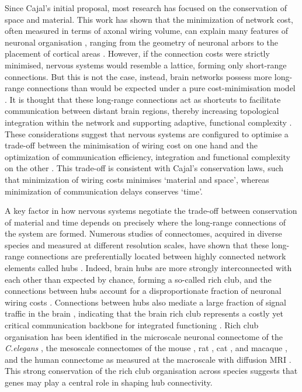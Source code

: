 Since Cajal's initial proposal, most research has focused on the conservation of space and material. This work has shown that the minimization of network cost, often measured in terms of axonal wiring volume, can explain many features of neuronal organisation \citep{Cherniak1994,Chklovskii2002,Klyachko2003,Rivera-Alba2011,Wen2005}, ranging from the geometry of neuronal arbors \citep{Cherniak1999} to the placement of cortical areas \citep{Cherniak2004}. However, if the connection costs were strictly minimised, nervous systems would resemble a lattice, forming only short-range connections. But this is not the case, instead, brain networks possess more long-range connections than would be expected under a pure cost-minimisation model \citep{Bassett2006,Bullmore2012,Kaiser2006}. It is thought that these long-range connections act as shortcuts to facilitate communication between distant brain regions, thereby increasing topological integration within the network \citep{Bullmore2012,Buzsaki2004a,VandenHeuvel2012} and supporting adaptive, functional complexity \citep{Betzel2018}. These considerations suggest that nervous systems are configured to optimise a trade-off between the minimisation of wiring cost on one hand and the optimization of communication efficiency, integration and functional complexity on the other \citep{Bullmore2012}. This trade-off is consistent with Cajal's conservation laws, such that minimization of wiring costs minimises `material and space', whereas minimization of communication delays conserves `time'.

A key factor in how nervous systems negotiate the trade-off between conservation of material and time depends on precisely where the long-range connections of the system are formed. Numerous studies of connectomes, acquired in diverse species and measured at different resolution scales, have shown that these long-range connections are preferentially located between highly connected network elements called hubs \citep{Harriger2012,Towlson2013,VandenHeuvel2011,VandenHeuvel2013b}. Indeed, brain hubs are more strongly interconnected with each other than expected by chance, forming a so-called rich club, and the connections between hubs account for a disproportionate fraction of neuronal wiring costs \citep{Arnatkeviciute2018,Fulcher2016,Harriger2012,Towlson2013,VandenHeuvel2011}. Connections between hubs also mediate a large fraction of signal traffic in the brain \citep{Misic2016,VandenHeuvel2011}, indicating that the brain rich club represents a costly yet critical communication backbone for integrated  functioning \citep{Gratton2012,Markov2013a,VandenHeuvel2018,VandenHeuvel2013a}. Rich club organisation has been identified in the microscale neuronal connectome of the \textit{C.elegans} \citep{Towlson2013}, the mesoscale connectomes of the mouse \citep{Fulcher2016}, rat \citep{Liang2017}, cat \citep{DeReus2013b}, and macaque \citep{Harriger2012}, and the human connectome as measured at the macroscale with diffusion MRI \citep{VandenHeuvel2011}. This strong conservation of the rich club organisation across species suggests that genes may play a central role in shaping hub connectivity.

